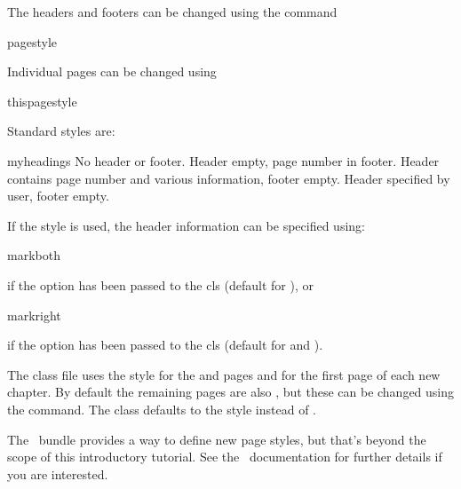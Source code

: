 The headers and footers can be changed using the command
\begin{definition}
\gls{pagestyle}
\end{definition}%
Individual pages can be changed using
\begin{definition}
\gls{thispagestyle}
\end{definition}%
Standard styles are:
\begin{fwlist}{myheadings}
 No header or footer. 
 Header empty, page number in footer.
  Header contains page number and various information, 
 footer empty. 
 Header specified by user, footer empty.
\end{fwlist}

If the  style is used, the header information
can be specified using:
\begin{definition}
\gls{markboth}
\end{definition}%
if the  option has been passed to the
\gls{cls} (default for ), or
\begin{definition}
\gls{markright}
\end{definition}%
if the  option has been passed to the \gls{cls}
(default for  and ).

The  class file uses the  style
for the  and  pages and
 for the first page of each new chapter.  By
default the remaining pages are also , but
these can be changed using the  command.
The  class defaults to the 
style instead of .

%
The \koma\ bundle provides a way to define new page
styles, but that's beyond the scope of this introductory tutorial. 
See the \koma\ documentation for further details if you are
interested.

